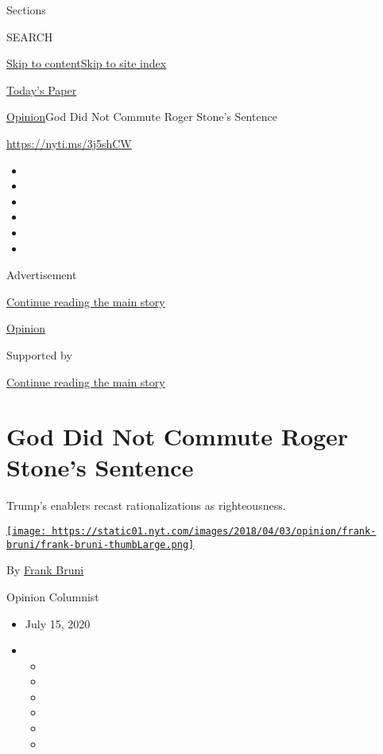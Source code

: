 Sections

SEARCH

\protect\hyperlink{site-content}{Skip to
content}\protect\hyperlink{site-index}{Skip to site index}

\href{https://myaccount.nytimes.com/auth/login?response_type=cookie\&client_id=vi}{}

\href{https://www.nytimes.com/section/todayspaper}{Today's Paper}

\href{/section/opinion}{Opinion}\textbar{}God Did Not Commute Roger
Stone's Sentence

\href{https://nyti.ms/3j5shCW}{https://nyti.ms/3j5shCW}

\begin{itemize}
\item
\item
\item
\item
\item
\item
\end{itemize}

Advertisement

\protect\hyperlink{after-top}{Continue reading the main story}

\href{/section/opinion}{Opinion}

Supported by

\protect\hyperlink{after-sponsor}{Continue reading the main story}

\hypertarget{god-did-not-commute-roger-stones-sentence}{%
\section{God Did Not Commute Roger Stone's
Sentence}\label{god-did-not-commute-roger-stones-sentence}}

Trump's enablers recast rationalizations as righteousness.

\href{https://www.nytimes.com/by/frank-bruni}{\texttt{[image: https://static01.nyt.com/images/2018/04/03/opinion/frank-bruni/frank-bruni-thumbLarge.png]}}

By \href{https://www.nytimes.com/by/frank-bruni}{Frank Bruni}

Opinion Columnist

\begin{itemize}
\item
  July 15, 2020
\item
  \begin{itemize}
  \item
  \item
  \item
  \item
  \item
  \item
  \end{itemize}
\end{itemize}

